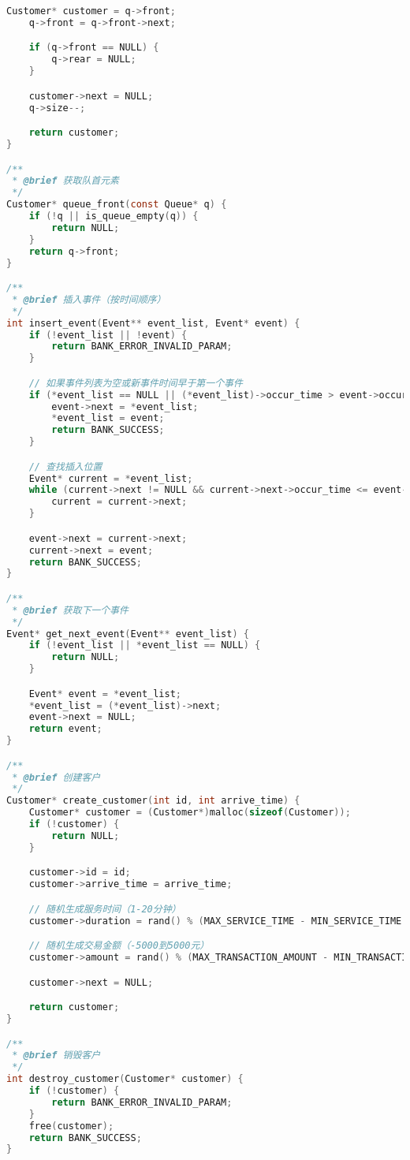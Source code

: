 \documentclass[12pt,a4paper]{article}
\begin{document}
\begin{lstlisting}[language=C,caption=bank\_simulation.c]
    Customer* customer = q->front;
    q->front = q->front->next;

    if (q->front == NULL) {
        q->rear = NULL;
    }

    customer->next = NULL;
    q->size--;

    return customer;
}

/**
 * @brief 获取队首元素
 */
Customer* queue_front(const Queue* q) {
    if (!q || is_queue_empty(q)) {
        return NULL;
    }
    return q->front;
}

/**
 * @brief 插入事件（按时间顺序）
 */
int insert_event(Event** event_list, Event* event) {
    if (!event_list || !event) {
        return BANK_ERROR_INVALID_PARAM;
    }

    // 如果事件列表为空或新事件时间早于第一个事件
    if (*event_list == NULL || (*event_list)->occur_time > event->occur_time) {
        event->next = *event_list;
        *event_list = event;
        return BANK_SUCCESS;
    }

    // 查找插入位置
    Event* current = *event_list;
    while (current->next != NULL && current->next->occur_time <= event->occur_time) {
        current = current->next;
    }

    event->next = current->next;
    current->next = event;
    return BANK_SUCCESS;
}

/**
 * @brief 获取下一个事件
 */
Event* get_next_event(Event** event_list) {
    if (!event_list || *event_list == NULL) {
        return NULL;
    }

    Event* event = *event_list;
    *event_list = (*event_list)->next;
    event->next = NULL;
    return event;
}

/**
 * @brief 创建客户
 */
Customer* create_customer(int id, int arrive_time) {
    Customer* customer = (Customer*)malloc(sizeof(Customer));
    if (!customer) {
        return NULL;
    }

    customer->id = id;
    customer->arrive_time = arrive_time;

    // 随机生成服务时间（1-20分钟）
    customer->duration = rand() % (MAX_SERVICE_TIME - MIN_SERVICE_TIME + 1) + MIN_SERVICE_TIME;

    // 随机生成交易金额（-5000到5000元）
    customer->amount = rand() % (MAX_TRANSACTION_AMOUNT - MIN_TRANSACTION_AMOUNT + 1) + MIN_TRANSACTION_AMOUNT;

    customer->next = NULL;

    return customer;
}

/**
 * @brief 销毁客户
 */
int destroy_customer(Customer* customer) {
    if (!customer) {
        return BANK_ERROR_INVALID_PARAM;
    }
    free(customer);
    return BANK_SUCCESS;
}


\end{lstlisting}
\end{document}
